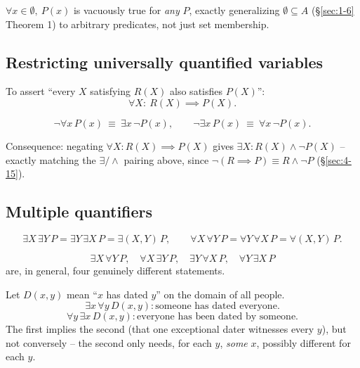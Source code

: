 \bigskip
\begin{note}
$\forall x\in\emptyset,\ P(x)$ is vacuously true for \emph{any} $P$, exactly generalizing $\emptyset\subseteq A$ (\S\ref{sec:1-6} Theorem 1) to arbitrary predicates, not just set membership.
\end{note}

\subsection{Restricting universally quantified variables}
\label{sec:5-9}

\begin{note}
To assert ``every $X$ satisfying $R(X)$ also satisfies $P(X)$'':
\[
\forall X:\ R(X) \implies P(X).
\]
\end{note}

\bigskip
\begin{note}
\[
\neg\forall x\, P(x) \ \equiv\ \exists x\,\neg P(x), \qquad \neg\exists x\, P(x) \ \equiv\ \forall x\,\neg P(x).
\]
\end{note}
\begin{note}
Consequence: negating $\forall X: R(X)\implies P(X)$ gives $\exists X: R(X)\wedge\neg P(X)$ -- exactly matching the $\exists/\wedge$ pairing above, since $\neg(R\implies P) \equiv R\wedge\neg P$ (\S\ref{sec:4-15}).
\end{note}

\subsection{Multiple quantifiers}
\label{sec:5-10}

\begin{note}
\[
\exists X\,\exists Y\, P = \exists Y\,\exists X\, P = \exists(X,Y)\, P, \qquad
\forall X\,\forall Y\, P = \forall Y\,\forall X\, P = \forall(X,Y)\, P.
\]
\end{note}

\begin{note}
\[
\exists X\,\forall Y\, P, \quad \forall X\,\exists Y\, P, \quad \exists Y\,\forall X\, P, \quad \forall Y\,\exists X\, P
\]
are, in general, four genuinely different statements.
\end{note}

\bigskip
\begin{example}
Let $D(x,y)$ mean ``$x$ has dated $y$'' on the domain of all people.
\[
\exists x\,\forall y\, D(x,y): \text{someone has dated everyone}.
\]
\[
\forall y\,\exists x\, D(x,y): \text{everyone has been dated by someone.}
\]
The first implies the second (that one exceptional dater witnesses every $y$), but not conversely -- the second only needs, for each $y$, \emph{some} $x$, possibly different for each $y$.
\end{example}


